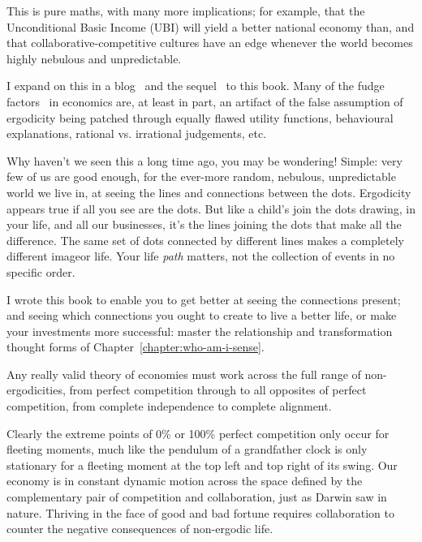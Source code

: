 This is pure maths, with many more implications; for example, that the Unconditional Basic Income (UBI) will yield a better national economy than, and that collaborative-competitive cultures have an edge whenever the world becomes highly nebulous and unpredictable.




I expand on this in a blog~\cite{boyd-lines-dots} and the sequel~\cite{Lucky} to this book. Many of the fudge factors~\cite{peters-gell-mann} in economics are, at least in part, an artifact of the false assumption of ergodicity being patched through equally flawed utility functions, behavioural explanations, rational vs. irrational judgements, etc. 


Why haven’t we seen this a long time ago, you may be wondering! Simple: very few of us are good enough, for the ever-more random, nebulous, unpredictable world we live in, at seeing the lines and connections between the dots. Ergodicity appears true if all you see are the dots. But like a child’s join the dots drawing, in your life, and all our businesses, it’s the lines joining the dots that make all the difference. The same set of dots connected by different lines makes a completely different image\textemdash or life. Your life \emph{path} matters, not the collection of events in no specific order. 


I wrote this book to enable you to get better at seeing the connections present; and seeing which connections you ought to create to live a better life, or make your investments more successful: master the relationship and transformation thought forms of Chapter~\ref{chapter:who-am-i-sense}.


Any really valid theory of economies must work across the full range of non-ergodicities, from perfect competition through to all opposites of perfect competition, from complete independence to complete alignment. 


Clearly the extreme points of 0\% or 100\% perfect competition  only occur for fleeting moments, much like the pendulum of a grandfather clock is only stationary for a fleeting moment at the top left and top right of its swing. Our economy is in constant dynamic motion across the space defined by the complementary pair of competition  and collaboration, just as Darwin  saw in nature. Thriving in the face of good and bad fortune requires collaboration to counter the negative consequences of non-ergodic life.


